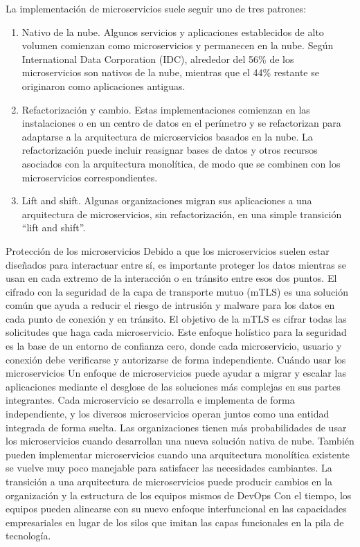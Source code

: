 \documentclass[12pt]{article}
\begin{document}
La implementación de microservicios suele seguir uno de tres patrones:
\begin{enumerate} 
\item Nativo de la nube. Algunos servicios y aplicaciones establecidos de alto volumen comienzan como microservicios y permanecen en la nube. Según International Data Corporation (IDC), alrededor del 56\% de los microservicios son nativos de la nube, mientras que el 44\% restante se originaron como aplicaciones antiguas.
\item Refactorización y cambio. Estas implementaciones comienzan en las instalaciones o en un centro de datos en el perímetro y se refactorizan para adaptarse a la arquitectura de microservicios basados en la nube. La refactorización puede incluir reasignar bases de datos y otros recursos asociados con la arquitectura monolítica, de modo que se combinen con los microservicios correspondientes.
\item Lift and shift. Algunas organizaciones migran sus aplicaciones a una arquitectura de microservicios, sin refactorización, en una simple transición “lift and shift”.
\end{enumerate}
Protección de los microservicios
Debido a que los microservicios suelen estar diseñados para interactuar entre sí, es importante proteger los datos mientras se usan en cada extremo de la interacción o en tránsito entre esos dos puntos.
El cifrado con la seguridad de la capa de transporte mutuo (mTLS) es una solución común que ayuda a reducir el riesgo de intrusión y malware para los datos en cada punto de conexión y en tránsito. El objetivo de la mTLS es cifrar todas las solicitudes que haga cada microservicio. Este enfoque holístico para la seguridad es la base de un entorno de confianza cero, donde cada microservicio, usuario y conexión debe verificarse y autorizarse de forma independiente.
Cuándo usar los microservicios
Un enfoque de microservicios puede ayudar a migrar y escalar las aplicaciones mediante el desglose de las soluciones más complejas en sus partes integrantes. Cada microservicio se desarrolla e implementa de forma independiente, y los diversos microservicios operan juntos como una entidad integrada de forma suelta.
Las organizaciones tienen más probabilidades de usar los microservicios cuando desarrollan una nueva solución nativa de nube. También pueden implementar microservicios cuando una arquitectura monolítica existente se vuelve muy poco manejable para satisfacer las necesidades cambiantes.
La transición a una arquitectura de microservicios puede producir cambios en la organización y la estructura de los equipos mismos de DevOps Con el tiempo, los equipos pueden alinearse con su nuevo enfoque interfuncional en las capacidades empresariales en lugar de los silos que imitan las capas funcionales en la pila de tecnología.
\cite{IntelMicroservices}
\end{document}
